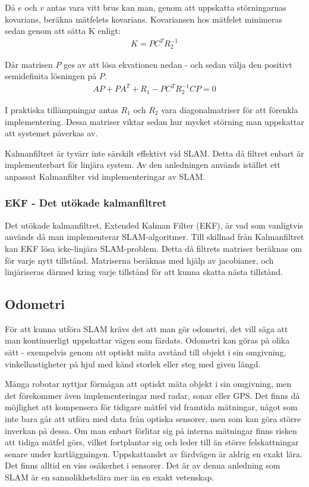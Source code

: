 \documentclass[a4paper,12pt,fleqn]{article}
\begin{document}
Då $e$ och $v$ antas vara vitt brus kan man, genom att uppskatta störningarnas kovarians, beräkna mätfelets kovarians. Kovariansen hos mätfelet minimeras sedan genom att sätta K enligt: 
\begin{gather}
K = PC^{T}R_{2}^{-1}
\end{gather}

Där matrisen $P$ ges av att lösa ekvationen nedan - och sedan välja den positivt semidefinita lösningen på $P$. 
\begin{gather}
AP + PA^{T} + R_{1} - PC^{T}R_{2}^{-1}CP = 0
\end{gather}

I praktiska tillämpningar antas $R_{1}$ och $R_{2}$ vara diagonalmatriser för att förenkla implementering. Dessa matriser viktar sedan hur mycket störning man uppskattar att systemet påverkas av. 

Kalmanfiltret är tyvärr inte särskilt effektivt vid SLAM. Detta då filtret enbart är implementerbart för linjära system. Av den anledningen används istället ett anpassat Kalmanfilter vid implementeringar av SLAM.  

\subsubsection{EKF - Det utökade kalmanfiltret}

Det utökade kalmanfiltret, Extended Kalman Filter (EKF), är vad som vanligtvis används då man implementerar SLAM-algoritmer. Till skillnad från Kalmanfiltret kan EKF lösa icke-linjära SLAM-problem. Detta då filtrets matriser beräknas om för varje nytt tillstånd. Matriserna beräknas med hjälp av jacobianer, och linjäriseras därmed kring varje tillstånd för att kunna skatta nästa tillstånd. 

\subsection{Odometri}

För att kunna utföra SLAM krävs det att man gör odometri, det vill säga att man kontinuerligt uppskattar vägen som färdats. Odometri kan göras på olika sätt - exempelvis genom att optiskt mäta avstånd till objekt i sin omgivning, vinkelhastigheter på hjul med känd storlek eller steg med given längd. 

Många robotar nyttjar förmågan att optiskt mäta objekt i sin omgivning, men det förekommer även implementeringar med radar, sonar eller GPS. Det finns då möjlighet att kompensera för tidigare mätfel vid framtida mätningar, något som inte bara går att utföra med data från optiska sensorer, men som kan göra större inverkan på dessa. Om man enbart förlitar sig på interna mätningar finns risken att tidiga mätfel görs, vilket fortplantar sig och leder till än större felskattningar senare under kartläggningen. 
Uppskattandet av färdvägen är aldrig en exakt lära. Det finns alltid en viss osäkerhet i sensorer. Det är av denna anledning som SLAM är en sannolikhetslära mer än en exakt vetenskap. 
\end{document}
